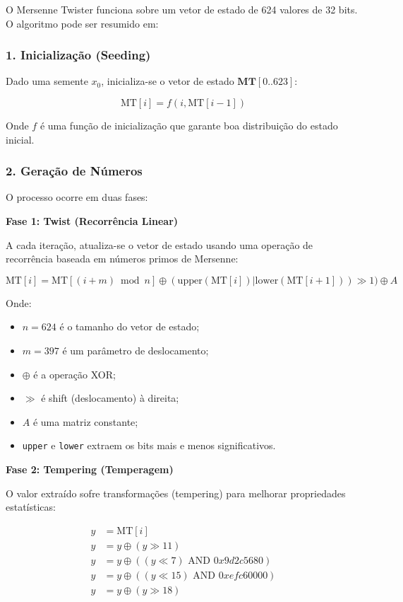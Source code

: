 \documentclass[12pt,a4paper]{article}
\begin{document}
O Mersenne Twister funciona sobre um vetor de estado de 624 valores de 32 bits. O algoritmo pode ser resumido em:

\subsubsection{1. Inicialização (Seeding)}

Dado uma semente $x_0$, inicializa-se o vetor de estado $\mathbf{MT}[0..623]$:

\begin{equation}
\text{MT}[i] = f(i, \text{MT}[i-1])
\end{equation}

Onde $f$ é uma função de inicialização que garante boa distribuição do estado inicial.

\subsubsection{2. Geração de Números}

O processo ocorre em duas fases:

\textbf{Fase 1: Twist (Recorrência Linear)}

A cada iteração, atualiza-se o vetor de estado usando uma operação de recorrência baseada em números primos de Mersenne:

\begin{equation}
\text{MT}[i] = \text{MT}[(i+m) \bmod n] \oplus (\text{upper}(\text{MT}[i]) | \text{lower}(\text{MT}[i+1])) \gg 1) \oplus A
\end{equation}

Onde:
\begin{itemize}
    \item $n = 624$ é o tamanho do vetor de estado;
    \item $m = 397$ é um parâmetro de deslocamento;
    \item $\oplus$ é a operação XOR;
    \item $\gg$ é shift (deslocamento) à direita;
    \item $A$ é uma matriz constante;
    \item \texttt{upper} e \texttt{lower} extraem os bits mais e menos significativos.
\end{itemize}

\textbf{Fase 2: Tempering (Temperagem)}

O valor extraído sofre transformações (tempering) para melhorar propriedades estatísticas:

\begin{align}
y &= \text{MT}[i] \\
y &= y \oplus (y \gg 11) \\
y &= y \oplus ((y \ll 7) \text{ AND } 0x9d2c5680) \\
y &= y \oplus ((y \ll 15) \text{ AND } 0xefc60000) \\
y &= y \oplus (y \gg 18)
\end{align}
\end{document}
